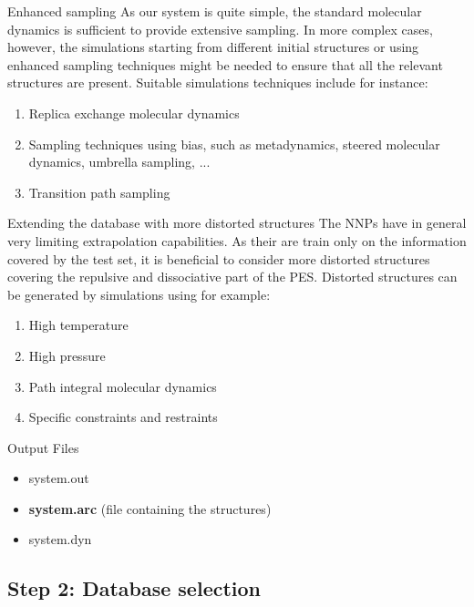 \documentclass[12pt]{article}
\newcommand\Warning{%
 \makebox[1.4em][c]{%
 \makebox[0pt][c]{\raisebox{.1em}{\small!}}%
 \makebox[0pt][c]{\color{red}\Large$\bigtriangleup$}}}%
\begin{document}
\begin{mybox1}{Enhanced sampling}
\Warning As our system is quite simple, the standard molecular dynamics is sufficient to provide extensive sampling. In more complex cases, however, the simulations starting from different initial structures or using enhanced sampling techniques might be needed to ensure that all the relevant structures are present. Suitable simulations techniques include for instance:
\begin{enumerate}
    \item Replica exchange molecular dynamics
    \item Sampling techniques using bias, such as metadynamics, steered molecular dynamics, umbrella sampling, ...
    \item Transition path sampling
\end{enumerate}
\end{mybox1}
\begin{mybox1}{Extending the database with more distorted structures}
\Warning The NNPs have in general very limiting extrapolation capabilities. As their are train only on the information covered by the test set, it is beneficial to consider more distorted structures covering the repulsive and dissociative part of the PES. Distorted structures can be generated by simulations using for example: 
\begin{enumerate}
    \item High temperature
    \item High pressure
    \item Path integral molecular dynamics
    \item Specific constraints and restraints
\end{enumerate}

\end{mybox1}
\begin{mybox3}{Output Files}
\begin{itemize}
    \item system.out
    \item \textbf{system.arc} (file containing the structures)
    \item system.dyn
\end{itemize}
\end{mybox3}
%
\subsection{Step 2: Database selection}
\end{document}
